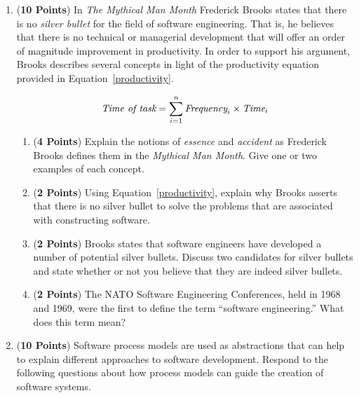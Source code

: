 \documentclass[12pt,epsf,psfig,graphics]{article}
\begin{document}
\begin{enumerate}
  
\item ({\bf 10 Points}) In {\em The Mythical Man Month} Frederick
  Brooks states that there is no {\em silver bullet} for the field of
  software engineering.  That is, he believes that there is no
  technical or managerial development that will offer an order of
  magnitude improvement in productivity. In order to support his
  argument, Brooks describes several concepts in light of the
  productivity equation provided in Equation~\ref{productivity}.

        \begin{equation} \label{productivity}
        \mbox{{\em Time of task}} = \sum_{i = 1}^{n} 
                \mbox{{\em Frequency}}_i \times \mbox{{\em Time}}_i
        \end{equation}

        \begin{enumerate}
          
        \item ({\bf 4 Points}) Explain the notions of {\em essence}
          and {\em accident} as Frederick Brooks defines them in the
          {\em Mythical Man Month}.  Give one or two examples of each
          concept.
          
        \item ({\bf 2 Points}) Using Equation~\ref{productivity},
          explain why Brooks asserts that there is no silver bullet to
          solve the problems that are associated with constructing
          software.
        
        \item ({\bf 2 Points}) Brooks states that software engineers
          have developed a number of potential silver bullets.
          Discuss two candidates for silver bullets and state whether
          or not you believe that they are indeed silver bullets.

        \item ({\bf 2 Points}) The NATO Software Engineering
          Conferences, held in 1968 and 1969, were the first to define
          the term ``software engineering.''  What does this term
          mean?

       \end{enumerate}
        
\newpage

\item ({\bf 10 Points}) Software process models are used as
  abstractions that can help to explain different approaches to
  software development. Respond to the following questions about how
  process models can guide the creation of software systems.


\end{enumerate}
\end{document}
